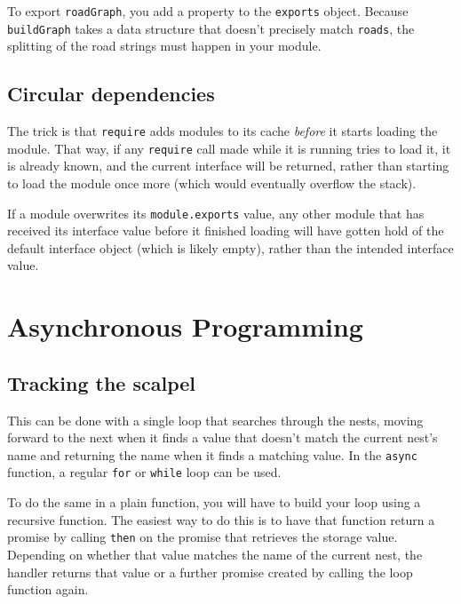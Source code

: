 To export \lstinline`roadGraph`, you add a property to the \lstinline`exports` object. Because \lstinline`buildGraph` takes a data structure that doesn't precisely match \lstinline`roads`, the splitting of the road strings must happen in your module.

\subsection{Circular dependencies}

The trick is that \lstinline`require` adds modules to its cache \emph{before} it starts loading the module. That way, if any \lstinline`require` call made while it is running tries to load it, it is already known, and the current interface will be returned, rather than starting to load the module once more (which would eventually overflow the stack).

If a module overwrites its \lstinline`module.exports` value, any other module that has received its interface value before it finished loading will have gotten hold of the default interface object (which is likely empty), rather than the intended interface value.

\section{Asynchronous Programming}

\subsection{Tracking the scalpel}

This can be done with a single loop that searches through the nests, moving forward to the next when it finds a value that doesn't match the current nest's name and returning the name when it finds a matching value. In the \lstinline`async` function, a regular \lstinline`for` or \lstinline`while` loop can be used.

To do the same in a plain function, you will have to build your loop using a recursive function. The easiest way to do this is to have that function return a promise by calling \lstinline`then` on the promise that retrieves the storage value. Depending on whether that value matches the name of the current nest, the handler returns that value or a further promise created by calling the loop function again.

